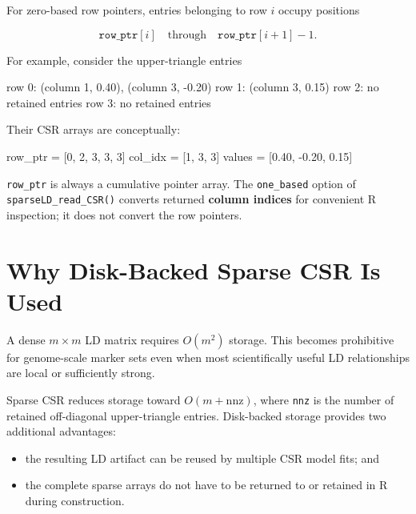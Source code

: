 \documentclass[
  11pt,
  letterpaper,
  DIV=11,
  numbers=noendperiod]{scrartcl}
\newenvironment{Shaded}{\begin{snugshade}}{\end{snugshade}}
\newcommand{\NormalTok}[1]{\textcolor[rgb]{0.12,0.11,0.11}{#1}}
\providecommand{\tightlist}{%
  \setlength{\itemsep}{0pt}\setlength{\parskip}{0pt}}
\begin{document}
For zero-based row pointers, entries belonging to row \(i\) occupy
positions

\[
\texttt{row\_ptr}[i]
\quad\text{through}\quad
\texttt{row\_ptr}[i+1]-1.
\]

For example, consider the upper-triangle entries

\begin{Shaded}
\begin{Highlighting}[]
\NormalTok{row 0: (column 1, 0.40), (column 3, {-}0.20)}
\NormalTok{row 1: (column 3, 0.15)}
\NormalTok{row 2: no retained entries}
\NormalTok{row 3: no retained entries}
\end{Highlighting}
\end{Shaded}

Their CSR arrays are conceptually:

\begin{Shaded}
\begin{Highlighting}[]
\NormalTok{row\_ptr = [0, 2, 3, 3, 3]}
\NormalTok{col\_idx = [1, 3, 3]}
\NormalTok{values  = [0.40, {-}0.20, 0.15]}
\end{Highlighting}
\end{Shaded}

\texttt{row\_ptr} is always a cumulative pointer array. The
\texttt{one\_based} option of \texttt{sparseLD\_read\_CSR()} converts
returned \textbf{column indices} for convenient R inspection; it does
not convert the row pointers.

\section{Why Disk-Backed Sparse CSR Is
Used}\label{why-disk-backed-sparse-csr-is-used}

A dense \(m\times m\) LD matrix requires \(O(m^2)\) storage. This
becomes prohibitive for genome-scale marker sets even when most
scientifically useful LD relationships are local or sufficiently strong.

Sparse CSR reduces storage toward \(O(m+\mathrm{nnz})\), where
\texttt{nnz} is the number of retained off-diagonal upper-triangle
entries. Disk-backed storage provides two additional advantages:

\begin{itemize}
\tightlist
\item
  the resulting LD artifact can be reused by multiple CSR model fits;
  and
\item
  the complete sparse arrays do not have to be returned to or retained
  in R during construction.
\end{itemize}
\end{document}
